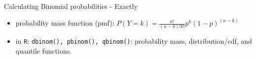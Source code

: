 \documentclass[10pt,handout]{beamer}\usepackage[]{graphicx}\usepackage[]{color}
\begin{document}

\begin{frame}{Calculating Binomial probabilities - Exactly}
	
	
	
	\begin{itemize}
		\item  probability mass function (pmf): $P(Y=k) =
		\frac{n!}{(n-k)!k!}p^k(1-p)^{(n-k)}$
		\item in \texttt{R}: \texttt{dbinom(), pbinom(), qbinom()}: \newline probability mass, distribution/cdf, and quantile functions.
	\end{itemize}
	
\end{frame}
\end{document}
